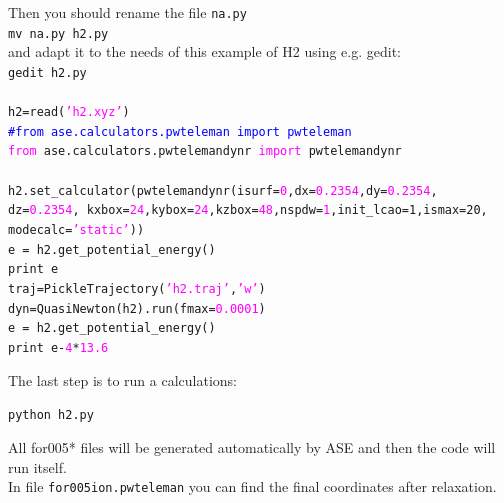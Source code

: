 \documentclass[10pt]{beamer}
\begin{document}
\begin{frame}
Then you should rename the file {\tt na.py}\\
{\tt mv na.py h2.py}\\
and adapt it to the needs of this example of H2 using e.g. gedit:\\
{\tt gedit h2.py}\\
~\\
\small{{\tt h2=read(\textcolor{magenta}{'h2.xyz'})\\
\textcolor{blue}{#from ase.calculators.pwteleman import pwteleman}\\
\textcolor{magenta}{from} ase.calculators.pwtelemandynr \textcolor{magenta}{import} pwtelemandynr\\
~\\
h2.set\_calculator(pwtelemandynr(isurf=\textcolor{magenta}{0},dx=\textcolor{magenta}{0.2354},dy=\textcolor{magenta}{0.2354},\\dz=\textcolor{magenta}{0.2354},
kxbox=\textcolor{magenta}{24},kybox=\textcolor{magenta}{24},kzbox=\textcolor{magenta}{48},nspdw=\textcolor{magenta}{1},init\_lcao=1,ismax=20,\\ modecalc=\textcolor{magenta}{'static'}))\\
e = h2.get\_potential\_energy()\\
print e\\
traj=PickleTrajectory(\textcolor{magenta}{'h2.traj'},\textcolor{magenta}{'w'})\\
dyn=QuasiNewton(h2).run(fmax=\textcolor{magenta}{0.0001})\\
e = h2.get\_potential\_energy()\\
print e-\textcolor{magenta}{4}*\textcolor{magenta}{13.6}}}
\end{frame}




\begin{frame}
The last step is to run a calculations:\\
\hspace*{0.2cm}

{\tt python h2.py}\\
\hspace*{0.2cm}

All for005* files will be generated automatically by ASE and then the code will run itself. \\
In file {\tt for005ion.pwteleman} you can find the final coordinates after relaxation. 

\end{frame}
\end{document}
